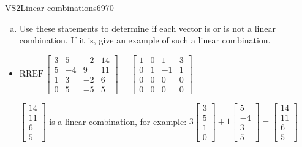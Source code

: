 \begin{exercise}{VS2}{Linear combinations}{6970}
\begin{exerciseStatement}
\begin{enumerate}[(a)]
\begin{itemize}
 
\end{itemize}

     
\item  

 Use these statements to determine if each vector is or is not a linear combination. If it is, give an example of such a linear combination. 

 
\end{enumerate}

     \end{exerciseStatement}
 \begin{exerciseAnswer} 

\begin{itemize}
\item  

 \(
\mathrm{RREF}\, \left[\begin{array}{ccc|c}
3 & 5 & -2 & 14 \\
5 & -4 & 9 & 11 \\
1 & 3 & -2 & 6 \\
0 & 5 & -5 & 5
\end{array}\right] = \left[\begin{array}{ccc|c}
1 & 0 & 1 & 3 \\
0 & 1 & -1 & 1 \\
0 & 0 & 0 & 0 \\
0 & 0 & 0 & 0
\end{array}\right]
                        \) 

 

 \(\left[\begin{array}{c}
14 \\
11 \\
6 \\
5
\end{array}\right]\) is a linear combination, for example: \(
3 \left[\begin{array}{c}
3 \\
5 \\
1 \\
0
\end{array}\right] + 1 \left[\begin{array}{c}
5 \\
-4 \\
3 \\
5
\end{array}\right] = \left[\begin{array}{c}
14 \\
11 \\
6 \\
5
\end{array}\right]
                            \) 


\end{itemize}
\end{exerciseAnswer}
\end{exercise}
